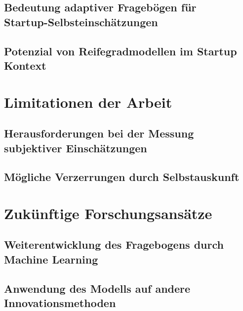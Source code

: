 \subsection{Bedeutung adaptiver Fragebögen für \\ Startup-Selbsteinschätzungen}
\subsection{Potenzial von Reifegradmodellen im Startup Kontext}

\section{Limitationen der Arbeit}
\subsection{Herausforderungen bei der Messung subjektiver Einschätzungen}
\subsection{Mögliche Verzerrungen durch Selbstauskunft}

\section{Zukünftige Forschungsansätze}
\subsection{Weiterentwicklung des Fragebogens durch Machine Learning}
\subsection{Anwendung des Modells auf andere Innovationsmethoden}
